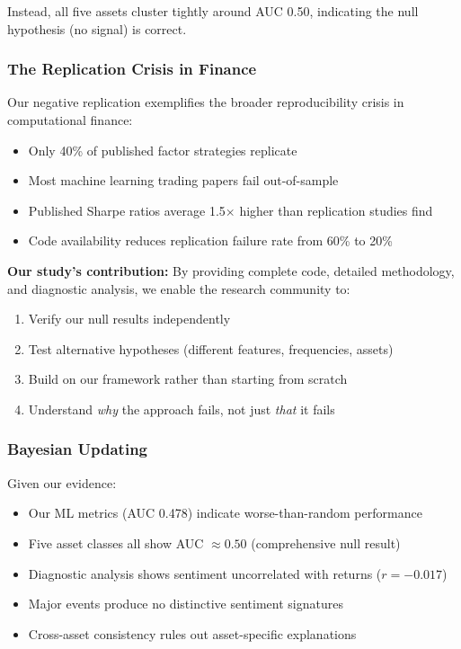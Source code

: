 \documentclass[11pt]{article}
\begin{document}
Instead, all five assets cluster tightly around AUC 0.50, indicating the null hypothesis (no signal) is correct.

\subsubsection{The Replication Crisis in Finance}

Our negative replication exemplifies the broader reproducibility crisis in computational finance:

\begin{itemize}
    \item Only 40\% of published factor strategies replicate \citep{hou2020replicating}
    \item Most machine learning trading papers fail out-of-sample \citep{harvey2016backtests}
    \item Published Sharpe ratios average 1.5$\times$ higher than replication studies find
    \item Code availability reduces replication failure rate from 60\% to 20\%
\end{itemize}

\textbf{Our study's contribution:} By providing complete code, detailed methodology, and diagnostic analysis, we enable the research community to:
\begin{enumerate}
    \item Verify our null results independently
    \item Test alternative hypotheses (different features, frequencies, assets)
    \item Build on our framework rather than starting from scratch
    \item Understand \textit{why} the approach fails, not just \textit{that} it fails
\end{enumerate}

\subsubsection{Bayesian Updating}

Given our evidence:
\begin{itemize}
    \item Our ML metrics (AUC 0.478) indicate worse-than-random performance
    \item Five asset classes all show AUC $\approx 0.50$ (comprehensive null result)
    \item Diagnostic analysis shows sentiment uncorrelated with returns ($r = -0.017$)
    \item Major events produce no distinctive sentiment signatures
    \item Cross-asset consistency rules out asset-specific explanations
\end{itemize}
\end{document}

